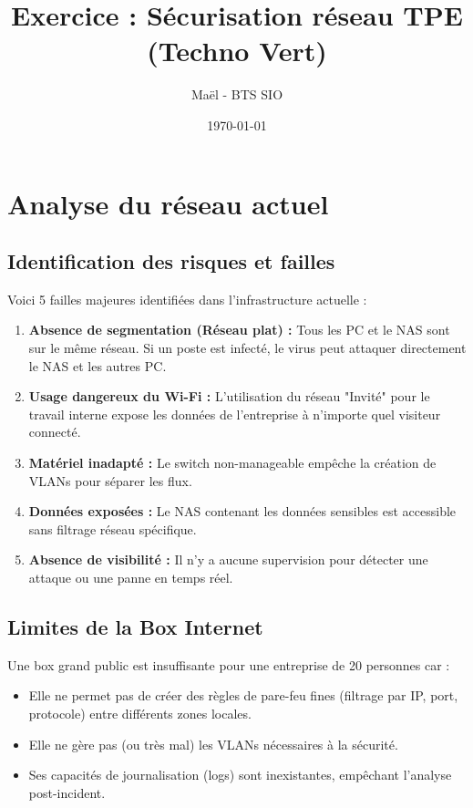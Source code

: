 \documentclass[a4paper,12pt]{article}
\title{\textbf{Exercice : Sécurisation réseau TPE (Techno Vert)}}
\author{Maël - BTS SIO}
\date{\today}
\begin{document}
\maketitle

\section{Analyse du réseau actuel}

\subsection{Identification des risques et failles}
Voici 5 failles majeures identifiées dans l'infrastructure actuelle :

\begin{enumerate}
    \item \textbf{Absence de segmentation (Réseau plat) :} Tous les PC et le NAS sont sur le même réseau. Si un poste est infecté, le virus peut attaquer directement le NAS et les autres PC.
    \item \textbf{Usage dangereux du Wi-Fi :} L'utilisation du réseau "Invité" pour le travail interne expose les données de l'entreprise à n'importe quel visiteur connecté.
    \item \textbf{Matériel inadapté :} Le switch non-manageable empêche la création de VLANs pour séparer les flux.
    \item \textbf{Données exposées :} Le NAS contenant les données sensibles est accessible sans filtrage réseau spécifique.
    \item \textbf{Absence de visibilité :} Il n'y a aucune supervision pour détecter une attaque ou une panne en temps réel.
\end{enumerate}

\subsection{Limites de la Box Internet}
Une box grand public est insuffisante pour une entreprise de 20 personnes car :
\begin{itemize}
    \item Elle ne permet pas de créer des règles de pare-feu fines (filtrage par IP, port, protocole) entre différents zones locales.
    \item Elle ne gère pas (ou très mal) les VLANs nécessaires à la sécurité.
    \item Ses capacités de journalisation (logs) sont inexistantes, empêchant l'analyse post-incident.
\end{itemize}
\end{document}

